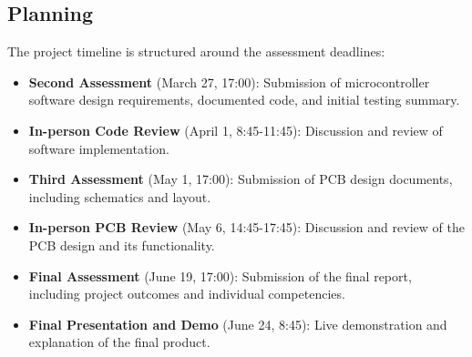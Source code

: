 \subsection{Planning}
The project timeline is structured around the assessment deadlines:
\begin{itemize}
    \item \textbf{Second Assessment} (March 27, 17:00): Submission of microcontroller software design requirements, documented code, and initial testing summary.
    \item \textbf{In-person Code Review} (April 1, 8:45-11:45): Discussion and review of software implementation.
    \item \textbf{Third Assessment} (May 1, 17:00): Submission of PCB design documents, including schematics and layout.
    \item \textbf{In-person PCB Review} (May 6, 14:45-17:45): Discussion and review of the PCB design and its functionality.
    \item \textbf{Final Assessment} (June 19, 17:00): Submission of the final report, including project outcomes and individual competencies.
    \item \textbf{Final Presentation and Demo} (June 24, 8:45): Live demonstration and explanation of the final product.
\end{itemize}



